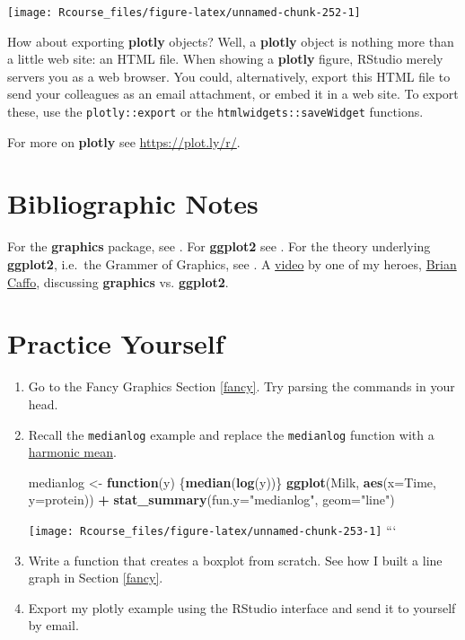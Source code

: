 \documentclass[]{book}
\newenvironment{Shaded}{\begin{snugshade}}{\end{snugshade}}
\newcommand{\KeywordTok}[1]{\textcolor[rgb]{0.13,0.29,0.53}{\textbf{#1}}}
\newcommand{\DataTypeTok}[1]{\textcolor[rgb]{0.13,0.29,0.53}{#1}}
\newcommand{\StringTok}[1]{\textcolor[rgb]{0.31,0.60,0.02}{#1}}
\newcommand{\ControlFlowTok}[1]{\textcolor[rgb]{0.13,0.29,0.53}{\textbf{#1}}}
\newcommand{\OperatorTok}[1]{\textcolor[rgb]{0.81,0.36,0.00}{\textbf{#1}}}
\newcommand{\NormalTok}[1]{#1}
\theoremstyle{definition}
\theoremstyle{definition}
\theoremstyle{definition}
\theoremstyle{remark}
\begin{document}
\texttt{[image: Rcourse\_files/figure-latex/unnamed-chunk-252-1]}

How about exporting \textbf{plotly} objects? Well, a \textbf{plotly}
object is nothing more than a little web site: an HTML file. When
showing a \textbf{plotly} figure, RStudio merely servers you as a web
browser. You could, alternatively, export this HTML file to send your
colleagues as an email attachment, or embed it in a web site. To export
these, use the \texttt{plotly::export} or the
\texttt{htmlwidgets::saveWidget} functions.

For more on \textbf{plotly} see \url{https://plot.ly/r/}.

\section{Bibliographic Notes}\label{bibliographic-notes-8}

For the \textbf{graphics} package, see \citet{Rlanguage}. For
\textbf{ggplot2} see \citet{ggplot2}. For the theory underlying
\textbf{ggplot2}, i.e.~the Grammer of Graphics, see
\citet{wilkinson2006grammar}. A
\href{https://www.youtube.com/watch?v=9Objw9Tvhb4\&feature=youtu.be}{video}
by one of my heroes, \href{http://www.bcaffo.com/}{Brian Caffo},
discussing \textbf{graphics} vs. \textbf{ggplot2}.

\section{Practice Yourself}\label{practice-yourself-8}

\begin{enumerate}
\def\labelenumi{\arabic{enumi}.}
\item
  Go to the Fancy Graphics Section \ref{fancy}. Try parsing the commands
  in your head.
\item
  Recall the \texttt{medianlog} example and replace the
  \texttt{medianlog} function with a
  \href{https://en.wikipedia.org/wiki/Harmonic_mean}{harmonic mean}.

\begin{Shaded}
\begin{Highlighting}[]
\NormalTok{medianlog <-}\StringTok{ }\ControlFlowTok{function}\NormalTok{(y) \{}\KeywordTok{median}\NormalTok{(}\KeywordTok{log}\NormalTok{(y))\}}
\KeywordTok{ggplot}\NormalTok{(Milk, }\KeywordTok{aes}\NormalTok{(}\DataTypeTok{x=}\NormalTok{Time, }\DataTypeTok{y=}\NormalTok{protein)) }\OperatorTok{+}
\StringTok{  }\KeywordTok{stat_summary}\NormalTok{(}\DataTypeTok{fun.y=}\StringTok{"medianlog"}\NormalTok{, }\DataTypeTok{geom=}\StringTok{"line"}\NormalTok{)}
\end{Highlighting}
\end{Shaded}

  \texttt{[image: Rcourse\_files/figure-latex/unnamed-chunk-253-1]}
  ```
\item
  Write a function that creates a boxplot from scratch. See how I built
  a line graph in Section \ref{fancy}.
\item
  Export my plotly example using the RStudio interface and send it to
  yourself by email.
\end{enumerate}
\end{document}
